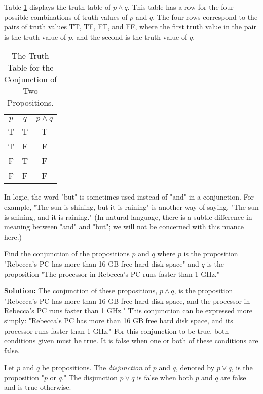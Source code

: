 \documentclass{Axon}
\begin{document}
Table \ref{Table: 2} displays the truth table of \(p \land q\). This table has a row for the four possible combinations of truth values of \(p\) and \(q\). The four rows correspond to the pairs of truth values TT, TF, FT, and FF, where the first truth value in the pair is the truth value of \(p\), and the second is the truth value of \(q\).

\begin{table}[h]
    \centering
    \begin{tabular}{c|c|c}
        \(p\) & \(q\) & \(p \land q\)\\
        T     & T     & T\\
        T     & F     & F\\
        F     & T     & F\\
        F     & F     & F
    \end{tabular}
    \caption{The Truth Table for the Conjunction of Two Propositions.}
    \label{Table: 2}
\end{table}

In logic, the word "but" is sometimes used instead of "and" in a conjunction. For example, "The sun is shining, but it is raining" is another way of saying, "The sun is shining, and it is raining." (In natural language, there is a subtle difference in meaning between "and" and "but"; we will not be concerned with this nuance here.)

\begin{example}\label{Example: 5}
    Find the conjunction of the propositions \(p\) and \(q\) where \(p\) is the proposition "Rebecca's PC has more than 16 GB free hard disk space" and \(q\) is the proposition "The processor in Rebecca's PC runs faster than 1 GHz."

    \noindent
    \textbf{Solution:}
    The conjunction of these propositions, \(p \land q\), is the proposition "Rebecca's PC has more than 16 GB free hard disk space, and the processor in Rebecca's PC runs faster than 1 GHz." This conjunction can be expressed more simply: "Rebecca's PC has more than 16 GB free hard disk space, and its processor runs faster than 1 GHz." For this conjunction to be true, both conditions given must be true. It is false when one or both of these conditions are false.
\end{example}

\begin{definition}
    Let \(p\) and \(q\) be propositions. The \textit{disjunction} of \(p\) and \(q\), denoted by \(p \lor q\), is the proposition "\(p\) or \(q\)." The disjunction \(p \lor q\) is false when both \(p\) and \(q\) are false and is true otherwise.
\end{definition}
\end{document}
